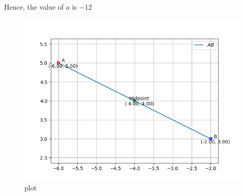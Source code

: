 \documentclass[journal]{IEEEtran}
\begin{document}
Hence, the value of $a$ is $\boxed{-12}$ 
\begin{figure}[H]
\centering
\includegraphics[width=0.75\columnwidth]{figs/1.png}
\caption{\centering plot}
\label{fig:placeholder_125}
\end{figure}
\end{document}
